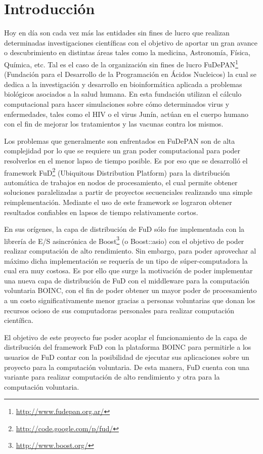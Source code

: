 \chapter{Introducción}
\label{chapter:introduccion}

Hoy en día son cada vez más las entidades sin fines de lucro que realizan determinadas investigaciones científicas con el objetivo de aportar un gran avance o descubrimiento en distintas áreas tales como la medicina, Astronomía, Física, Química, etc. Tal es el caso de la organización sin fines de lucro FuDePAN\footnote{\url{http://www.fudepan.org.ar/}} (Fundación para el Desarrollo de la Programación en Ácidos Nucleicos) la cual se dedica a la investigación y desarrollo en bioinformática aplicada a problemas biológicos asociados a la salud humana. En esta fundación utilizan el cálculo computacional para hacer simulaciones sobre cómo determinados virus y enfermedades, tales como el HIV o el virus Junín, actúan en el cuerpo humano con el fin de mejorar los tratamientos y las vacunas contra los mismos.

Los problemas que generalmente son enfrentados en FuDePAN son de alta complejidad por lo que se requiere un gran poder computacional para poder resolverlos en el menor lapso de tiempo posible. Es por eso que se desarrolló el framework FuD\footnote{\url{http://code.google.com/p/fud/}} (Ubiquitous Distribution Platform) para la distribución automática de trabajos en nodos de procesamiento, el cual permite obtener soluciones paralelizadas a partir de proyectos secuenciales realizando una simple reimplementación. Mediante el uso de este framework se lograron obtener resultados confiables en lapsos de tiempo relativamente cortos.

En sus orígenes, la capa de distribución de FuD sólo fue implementada con la librería de E/S asincrónica de Boost\footnote{\url{http://www.boost.org/}} (o Boost::asio) con el objetivo de poder realizar computación de alto rendimiento. Sin embargo, para poder aprovechar al máximo dicha implementación se requería de un tipo de súper-computadora la cual era muy costosa. Es por ello que surge la motivación de poder implementar una nueva capa de distribución de FuD con el middleware para la computación voluntaria BOINC, con el fin de poder obtener un mayor poder de procesamiento a un costo significativamente menor gracias a personas voluntarias que donan los recursos ocioso de sus computadoras personales para realizar computación científica.

El objetivo de este proyecto fue poder acoplar el funcionamiento de la capa de distribución del framework FuD con la plataforma BOINC para permitirle a los usuarios de FuD contar con la posibilidad de ejecutar sus aplicaciones sobre un proyecto para la computación voluntaria. De esta manera, FuD cuenta con una variante para realizar computación de alto rendimiento y otra para la computación voluntaria.

